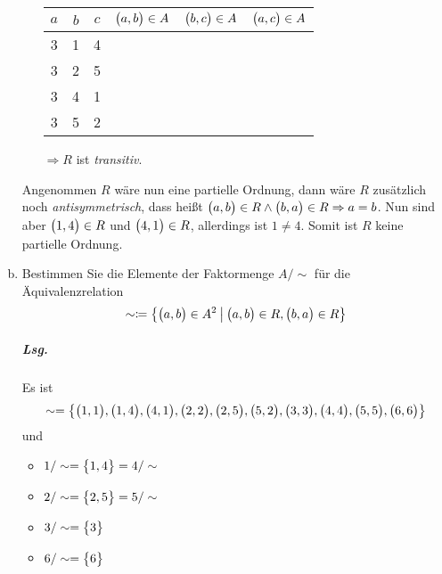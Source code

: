\documentclass{scrreprt}
\newcommand{\cmark}{\ding{51}}
\newcommand{\xmark}{\ding{55}}
\begin{document}
\begin{enumerate}[(a)]
\begin{itemize}
    \begin{tabular}{|c|c|c|c|c|c|}
      \hline
      $a$ & $b$ & $c$ & $\qty\big(a, b) \in A$ & $\qty\big(b, c) \in A$ & $\qty\big(a, c) \in A$ \\
      \hline
      3   & 1   & 4   & \cmark                 & \cmark                 & \cmark                 \\
      3   & 2   & 5   & \cmark                 & \cmark                 & \cmark                 \\
      3   & 4   & 1   & \cmark                 & \cmark                 & \cmark                 \\
      3   & 5   & 2   & \cmark                 & \cmark                 & \cmark                 \\
      \hline
    \end{tabular}

    $\Rightarrow R$ ist \emph{transitiv}.
  \end{itemize}

  Angenommen $R$ wäre nun eine partielle Ordnung, dann wäre $R$ zusätzlich noch
  \emph{antisymmetrisch}, dass heißt
  $\qty\big(a, b) \in R \land \qty\big(b, a) \in R \Rightarrow a = b$.
  Nun sind aber $\qty\big(1, 4) \in R$ und $\qty\big(4, 1) \in R$, allerdings
  ist $1 \ne 4$.
  Somit ist $R$ keine partielle Ordnung.

\item Bestimmen Sie die Elemente der Faktormenge $A/\sim$ für die
  Äquivalenzrelation
  \[
    \sim \coloneqq \qty{
      \qty\big(a, b) \in A^2
      \:\middle|\:
      \qty\big(a, b) \in R, \qty\big(b, a) \in R
    }
  \]

  \subparagraph{Lsg.} Es ist
  \[
    \sim = \qty{
      \qty\big(1, 1),
      \qty\big(1, 4),
      \qty\big(4, 1),
      \qty\big(2, 2),
      \qty\big(2, 5),
      \qty\big(5, 2),
      \qty\big(3, 3),
      \qty\big(4, 4),
      \qty\big(5, 5),
      \qty\big(6, 6)
    }
  \]
  und
  \begin{itemize}
  \item $1 / \sim = \qty\big{1, 4} = 4 / \sim$
  \item $2 / \sim = \qty\big{2, 5} = 5 / \sim$
  \item $3 / \sim = \qty\big{3}$
  \item $6 / \sim = \qty\big{6}$
  \end{itemize}


\end{enumerate}
\end{document}

